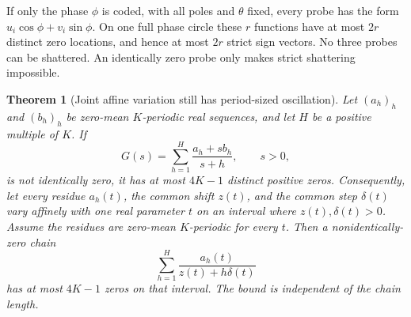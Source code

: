 \documentclass[11pt]{article}
\newtheorem{theorem}{Theorem}
\begin{document}
If only the phase $\phi$ is coded, with all poles and $\theta$
fixed, every probe has the form
$u_i\cos\phi+v_i\sin\phi$. On one full phase circle these
$r$ functions have at most $2r$ distinct zero locations, and hence
at most $2r$ strict sign vectors. No three probes can be shattered.
An identically zero probe only makes strict shattering impossible.


\begin{theorem}[Joint affine variation still has period-sized oscillation]
Let $(a_h)_h$ and $(b_h)_h$ be zero-mean $K$-periodic real sequences,
and let $H$ be a positive multiple of $K$. If
\[
 G(s)=\sum_{h=1}^H\frac{a_h+s b_h}{s+h},\qquad s>0,
\]
is not identically zero, it has at most $4K-1$ distinct positive zeros.
Consequently, let every residue $a_h(t)$, the common shift $z(t)$,
and the common step $\delta(t)$ vary affinely with one real parameter
$t$ on an interval where $z(t),\delta(t)>0$. Assume the residues
are zero-mean $K$-periodic for every $t$. Then a nonidentically-zero
chain
\[
 \sum_{h=1}^H\frac{a_h(t)}{z(t)+h\delta(t)}
\]
has at most $4K-1$ zeros on that interval. The bound is independent
of the chain length.
\end{theorem}
\end{document}
